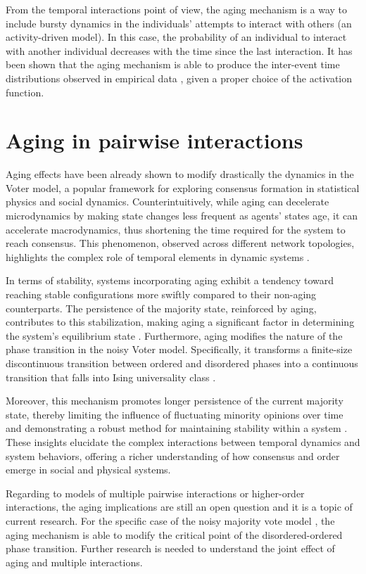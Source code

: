 From the temporal interactions point of view, the aging mechanism is a way to include bursty dynamics in the individuals' attempts to interact with others (an activity-driven model). In this case, the probability of an individual to interact with another individual decreases with the time since the last interaction. It has been shown that the aging mechanism is able to produce the inter-event time distributions observed in empirical data \cite{fernandez-gracia-2011}, given a proper choice of the activation function.

\section{\label{sec:Aging in pairwise interactions} Aging in pairwise interactions}

Aging effects have been already shown to modify drastically the dynamics in the Voter model, a popular framework for exploring consensus formation in statistical physics and social dynamics. Counterintuitively, while aging can decelerate microdynamics by making state changes less frequent as agents' states age, it can accelerate macrodynamics, thus shortening the time required for the system to reach consensus. This phenomenon, observed across different network topologies, highlights the complex role of temporal elements in dynamic systems \cite{Stark2008,fernandez-gracia-2011, perez-2016, perez-2016,boguna-2014}.

In terms of stability, systems incorporating aging exhibit a tendency toward reaching stable configurations more swiftly compared to their non-aging counterparts. The persistence of the majority state, reinforced by aging, contributes to this stabilization, making aging a significant factor in determining the system's equilibrium state \cite{peralta-2020}. Furthermore, aging modifies the nature of the phase transition in the noisy Voter model. Specifically, it transforms a finite-size discontinuous transition between ordered and disordered phases into a continuous transition that falls into Ising universality class \cite{artime-2018}.

Moreover, this mechanism promotes longer persistence of the current majority state, thereby limiting the influence of fluctuating minority opinions over time and demonstrating a robust method for maintaining stability within a system \cite{peralta-2020}. These insights elucidate the complex interactions between temporal dynamics and system behaviors, offering a richer understanding of how consensus and order emerge in social and physical systems.

Regarding to models of multiple pairwise interactions or higher-order interactions, the aging implications are still an open question and it is a topic of current research. For the specific case of the noisy majority vote model \cite{chen-2020}, the aging mechanism is able to modify the critical point of the disordered-ordered phase transition. Further research is needed to understand the joint effect of aging and multiple interactions.
